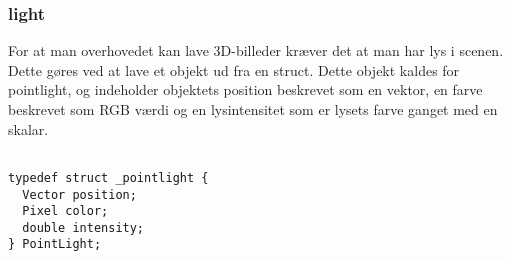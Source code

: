\subsubsection{light}
For at man overhovedet kan lave 3D-billeder kræver det at man har lys i scenen. Dette gøres ved at lave et objekt ud fra en struct. Dette objekt kaldes for pointlight, og indeholder objektets position beskrevet som en vektor, en farve beskrevet som RGB værdi og en lysintensitet som er lysets farve ganget med en skalar.

\begin{lstlisting}[style=Cstyle, caption=light struct]

typedef struct _pointlight {
  Vector position;
  Pixel color;
  double intensity;
} PointLight;

\end{lstlisting}